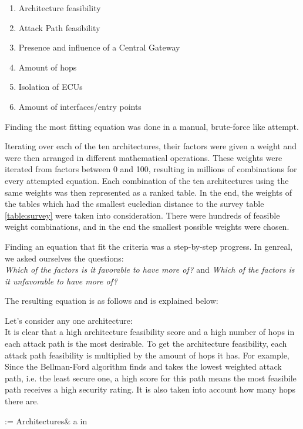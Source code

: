 \begin{enumerate}
    \item Architecture feasibility
    \item Attack Path feasibility
    \item Presence and influence of a Central Gateway
    \item Amount of hops 
    \item Isolation of ECUs
    \item Amount of interfaces/entry points
\end{enumerate}

Finding the most fitting equation was done in a manual, brute-force like attempt.

Iterating over each of the ten architectures, their factors were given a weight and were then arranged in different mathematical operations.
These weights were iterated from factors between 0 and 100, resulting in millions of combinations for every attempted equation.
Each combination of the ten architectures using the same weights was then represented as a ranked table. 
In the end, the weights of the tables which had the smallest eucledian distance to the survey table \ref{table:survey} were taken into consideration.
There were hundreds of feasible weight combinations, and in the end the smallest possible weights were chosen.

Finding an equation that fit the criteria was a step-by-step progress.
In genreal, we asked ourselves the questions:\\
\textit{Which of the factors is it favorable to have more of?} and \textit{Which of the factors is it unfavorable to have more of?}

The resulting equation is as follows and is explained below:



Let's consider any one architecture:\\
It is clear that a high architecture feasibility score and a high number of hops in each attack path is the most desirable.
To get the architecture feasibility, each attack path feasibility is multiplied by the amount of hops it has.
For example, 
Since the Bellman-Ford algorithm finds and takes the lowest weighted attack path, i.e. the least secure one, 
a high score for this path means the most feasibile path receives a high security rating.
It is also taken into account how many hops there are. 


 := {Architectures}& a in 


